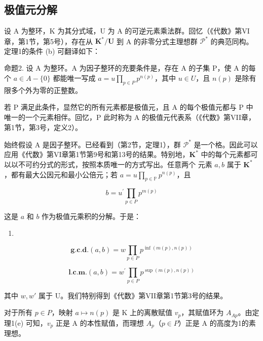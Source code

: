 \subsection{极值元分解}

设 A 为整环，K 为其分式域，U 为 A 的可逆元素乘法群。回忆（《代数》第VI章，第1节，第5号），存在从 \(\mathbf{K}^* / \mathbf{U}\) 到 A 的非零分式主理想群 \(\mathcal{P}^*\) 的典范同构。定理1的条件 (b) 可翻译如下：

命题2. 设 A 为整环。A 为因子整环的充要条件是，存在 A 的子集 P，使 A 的每个 \(a \in A - \{0\}\) 都能唯一写成 \(a = u \prod_{p \in P} p^{n(p)}\)，其中 \(u \in U\)，且 \(n(p)\) 是除有限多个外为零的正整数。

若 P 满足此条件，显然它的所有元素都是极值元，且 A 的每个极值元都与 P 中唯一的一个元素相伴。回忆，P 此时称为 A 的极值元代表系（《代数》第VII章，第1节，第3号，定义2）。

始终假设 A 是因子整环。已经看到（第2节，定理1），群 \(\mathcal{P}^*\) 是一个格。因此可以应用《代数》第VI章第1节第9号和第13号的结果。特别地，\(\mathbf{K}^*\) 中的每个元素都可以以不可约分式的形式，按照本质唯一的方式写出。任意两个
元素 \(a, b\) 属于 \(\mathbf{K}^*\)，都有最大公因元和最小公倍元；若 \(a = u\prod_{p\in \mathbb{P}}p^{n(p)}\)，且

\[
b = u ^ {\prime} \prod_ {p \in P} p ^ {m (p)}
\]

这是 \(a\) 和 \(b\) 作为极值元乘积的分解。于是：

\begin{enumerate}
\def\labelenumi{(\arabic{enumi})}
\tightlist
\item
\end{enumerate}

\[
\mathbf {g . c . d .} (a, b) = w \prod_ {p \in P} p ^ {\inf (m (p), n (p))}\tag{2}
\]

\[
\mathbf {l . c . m .} (a, b) = w ^ {\prime} \prod_ {p \in P} p ^ {\sup (m (p), n (p))}
\]

其中 \(w, w'\) 属于 U。我们特别得到《代数》第VII章第1节第3号的结果。

对于所有 \(p \in P\)，映射 \(a \mapsto n(p)\) 是 K 上的离散赋值 \(v_{p}\)，其赋值环为 \(A_{Ap}\)。由定理1(e) 可知，\(v_{p}\) 正是 A 的本性赋值，而理想 \(A_{p}\)（\(p \in P\)）正是 A 的高度为1的素理想。

